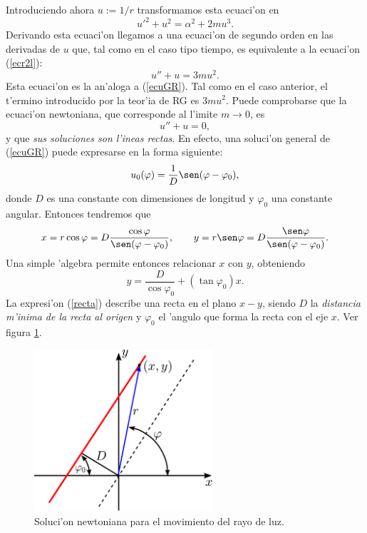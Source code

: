 Introduciendo ahora $u:=1/r$ transformamos esta ecuaci'on en
\begin{equation}
 u'^2+u^2=\alpha^2+2mu^3. \label{ecul0}
\end{equation}
Derivando esta ecuaci'on llegamos a una ecuaci'on de segundo orden en las derivadas de $u$ que, tal como en el caso tipo tiempo, es equivalente a la ecuaci'on (\ref{ecr2l}):
\begin{equation}
 u''+u=3mu^2. \label{ecglrg}
\end{equation}
Esta ecuaci'on es la an'aloga a (\ref{ecuGR}). Tal como en el caso anterior, el t'ermino introducido por la teor'ia de RG es $3mu^2$. Puede comprobarse que la ecuaci'on newtoniana, que corresponde al l'imite $m\to 0$, es
\begin{equation}
 u''+u=0, \label{ecglnew}
\end{equation}
y que \textit{sus soluciones son l'ineas rectas}. En efecto, una soluci'on general de (\ref{ecuGR}) puede expresarse en la forma siguiente:
\begin{equation}
 u_0(\varphi)=\frac{1}{D}\sen(\varphi-\varphi_0),
\end{equation}
donde $D$ es una constante con dimensiones de longitud y $\varphi_0$ una constante angular. Entonces tendremos que
\begin{equation}
x=r\cos\varphi=D\frac{\cos\varphi}{\sen(\varphi-\varphi_0)}, \qquad
y=r\sen\varphi=D\frac{\sen\varphi}{\sen(\varphi-\varphi_0)}.
\end{equation}
Una simple 'algebra permite entonces relacionar $x$ con $y$, obteniendo
\begin{equation}
 y=\frac{D}{\cos\varphi_0}+\left(\tan\varphi_0\right)x. \label{recta}
\end{equation}
La expresi'on (\ref{recta}) describe una recta en el plano $x-y$, siendo $D$ la \textit{distancia m'inima de la recta al origen} y $\varphi_0$ el 'angulo que forma la recta con el eje $x$. Ver figura \ref{fig:recta}.
\begin{figure}[H]
 \begin{center}
\includegraphics[height=6cm]{fig/fig-recta.pdf}
\caption{Soluci'on newtoniana para el movimiento del rayo de luz.}
\label{fig:recta}
\end{center}
\end{figure}

